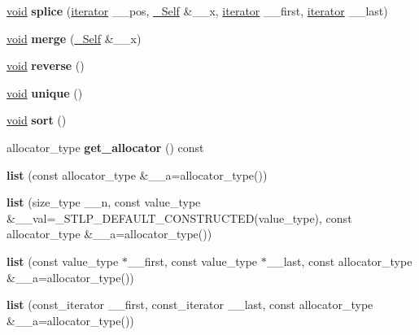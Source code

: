 \begin{DoxyCompactItemize}
\hyperlink{interfacevoid}{void} {\bfseries splice} (\hyperlink{structiterator}{iterator} \+\_\+\+\_\+pos, \hyperlink{classlist}{\+\_\+\+Self} \&\+\_\+\+\_\+x, \hyperlink{structiterator}{iterator} \+\_\+\+\_\+first, \hyperlink{structiterator}{iterator} \+\_\+\+\_\+last)
\item 
\mbox{\label{classlist_a3517ca7c839747061d80808313633dc2}} 
\hyperlink{interfacevoid}{void} {\bfseries merge} (\hyperlink{classlist}{\+\_\+\+Self} \&\+\_\+\+\_\+x)
\item 
\mbox{\label{classlist_a802b55ccb93d228ee7034a7e0ac10df4}} 
\hyperlink{interfacevoid}{void} {\bfseries reverse} ()
\item 
\mbox{\label{classlist_a092e93c572cc4e13b73ca0211fdcff49}} 
\hyperlink{interfacevoid}{void} {\bfseries unique} ()
\item 
\mbox{\label{classlist_a881d5763b24c96c18cc0e3087700575a}} 
\hyperlink{interfacevoid}{void} {\bfseries sort} ()
\item 
\mbox{\label{classlist_a50a0381e1af7dc153bb51d79a2d5f21d}} 
allocator\+\_\+type {\bfseries get\+\_\+allocator} () const
\item 
\mbox{\label{classlist_af0d639828145b9429995b52d2b647f79}} 
{\bfseries list} (const allocator\+\_\+type \&\+\_\+\+\_\+a=allocator\+\_\+type())
\item 
\mbox{\label{classlist_ad2640e31a162aa4954f27ef6b99413f8}} 
{\bfseries list} (size\+\_\+type \+\_\+\+\_\+n, const value\+\_\+type \&\+\_\+\+\_\+val=\+\_\+\+S\+T\+L\+P\+\_\+\+D\+E\+F\+A\+U\+L\+T\+\_\+\+C\+O\+N\+S\+T\+R\+U\+C\+T\+ED(value\+\_\+type), const allocator\+\_\+type \&\+\_\+\+\_\+a=allocator\+\_\+type())
\item 
\mbox{\label{classlist_a6376b412c44ef40a1bb1c3e276f78526}} 
{\bfseries list} (const value\+\_\+type $\ast$\+\_\+\+\_\+first, const value\+\_\+type $\ast$\+\_\+\+\_\+last, const allocator\+\_\+type \&\+\_\+\+\_\+a=allocator\+\_\+type())
\item 
\mbox{\label{classlist_ad057f34d6514d6a725464d897a071625}} 
{\bfseries list} (const\+\_\+iterator \+\_\+\+\_\+first, const\+\_\+iterator \+\_\+\+\_\+last, const allocator\+\_\+type \&\+\_\+\+\_\+a=allocator\+\_\+type())

\end{DoxyCompactItemize}
